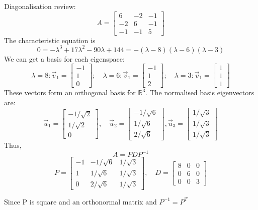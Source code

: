 \documentclass[12pt]{article} %
\newcommand{\R}{\mathbb{R}}
\begin{document}
Diagonalisation review:
$$A = \begin{bmatrix}
	6 & -2 & -1\\
	-2 & 6 & -1\\
	-1 & -1 & 5
\end{bmatrix}$$
The characteristic equation is 
$$0 = -\lambda^3 + 17\lambda^2 - 90\lambda + 144 = -(\lambda - 8)(\lambda - 6)(\lambda - 3)$$
We can get a basis for each eigenspace:
$$\lambda = 8: \vec{v}_1 = \begin{bmatrix}
	-1\\1\\0
\end{bmatrix}; \quad \lambda = 6: \vec{v}_1 = \begin{bmatrix}
	-1\\1\\2
\end{bmatrix}; \quad \lambda = 3: \vec{v}_1 = \begin{bmatrix}
	1\\1\\1
\end{bmatrix}$$
These vectors form an orthogonal basis for $\R^3$. The normalised basis eigenvectors are:
$$\vec{u}_1 = \begin{bmatrix}
	-1/\sqrt{2}\\
	1/\sqrt{2}\\
	0
\end{bmatrix}, \quad \vec{u}_2 = \begin{bmatrix}
	-1/\sqrt{6}\\
	1/\sqrt{6}\\
	2/\sqrt{6}
\end{bmatrix},
\vec{u}_3 = \begin{bmatrix}
	1/\sqrt{3}\\
	1/\sqrt{3}\\
	1/\sqrt{3}
\end{bmatrix}$$
Thus,
$$A = PDP^{-1}$$
$$P = \begin{bmatrix}
	-1 & -1/\sqrt{6} & 1/\sqrt{3}\\
	1 & 1/\sqrt{6} & 1/\sqrt{3}\\
	0 & 2/\sqrt{6} & 1/\sqrt{3}
\end{bmatrix}, \quad D = \begin{bmatrix}
	8 & 0 & 0\\
	0 & 6 & 0\\
	0 & 0 & 3
\end{bmatrix}$$

Since P is square and an orthonormal matrix and $P^{-1} = P^T$
\end{document}

